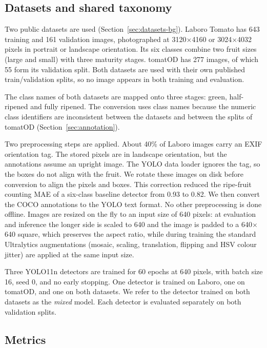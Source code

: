 \subsection{Datasets and shared taxonomy}

Two public datasets are used (Section~\ref{sec:datasets-bg}). Laboro Tomato
has 643 training and 161 validation images, photographed at
3120$\times$4160 or 3024$\times$4032 pixels in portrait or landscape
orientation. Its six classes combine two fruit sizes (large and small) with
three maturity stages. tomatOD has 277 images, of which 55 form its validation
split. Both datasets are used with their own published train/validation
splits, so no image appears in both training and evaluation.

The class names of both datasets are mapped onto three stages: green,
half-ripened and fully ripened. The conversion uses class names because the
numeric class identifiers are inconsistent between the datasets and between
the splits of tomatOD (Section~\ref{sec:annotation}).

Two preprocessing steps are applied. About 40\% of Laboro images carry an EXIF
orientation tag. The stored pixels are in landscape orientation, but the
annotations assume an upright image. The YOLO data loader ignores the tag, so
the boxes do not align with the fruit. We rotate these images on disk before
conversion to align the pixels and boxes. This correction reduced the
ripe-fruit counting MAE of a six-class baseline detector from 0.93 to 0.82. We
then convert the COCO annotations to the YOLO text format. No other
preprocessing is done offline. Images are resized on the fly to an input size
of 640 pixels: at evaluation and inference the longer side is scaled to 640 and
the image is padded to a 640$\times$640 square, which preserves the aspect
ratio, while during training the standard Ultralytics augmentations (mosaic,
scaling, translation, flipping and HSV colour jitter) are applied at the same
input size.

Three YOLO11n detectors are trained for 60 epochs at 640 pixels, with batch
size 16, seed 0, and no early stopping. One detector is trained on Laboro, one
on tomatOD, and one on both datasets. We refer to the detector trained on both
datasets as the \emph{mixed} model. Each detector is evaluated separately on
both validation splits.

\subsection{Metrics}


